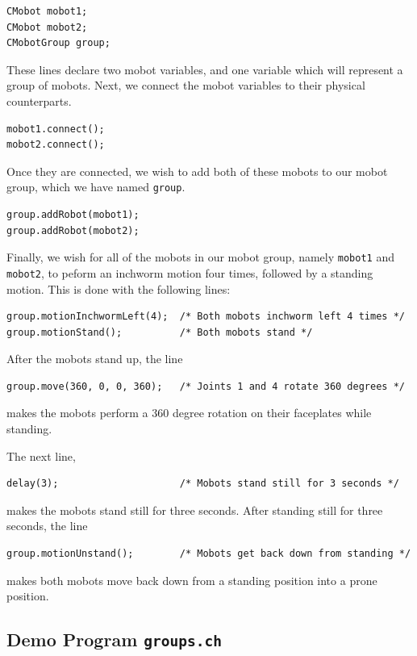 \documentclass{article}
\begin{document}
\begin{verbatim}
CMobot mobot1;
CMobot mobot2;
CMobotGroup group;
\end{verbatim}

These lines declare two mobot variables, and one variable which
will represent a group of mobots. Next, we connect the mobot
variables to their physical counterparts.

\begin{verbatim}
mobot1.connect();
mobot2.connect();
\end{verbatim}

Once they are connected, we wish to add both of these mobots to our mobot group,
which we have named \texttt{group}.

\begin{verbatim}
group.addRobot(mobot1);
group.addRobot(mobot2);
\end{verbatim}

Finally, we wish for all of the mobots in our mobot group, namely
\texttt{mobot1} and \texttt{mobot2}, to peform an inchworm motion four times, followed
by a standing motion. This is done with the following lines:

\begin{verbatim}
group.motionInchwormLeft(4);  /* Both mobots inchworm left 4 times */
group.motionStand();          /* Both mobots stand */
\end{verbatim}

After the mobots stand up, the line
\begin{verbatim}
group.move(360, 0, 0, 360);   /* Joints 1 and 4 rotate 360 degrees */
\end{verbatim}
makes the mobots perform a 360 degree rotation on their faceplates
while standing.

The next line, 
\begin{verbatim}
delay(3);                     /* Mobots stand still for 3 seconds */
\end{verbatim}
makes the mobots stand still for three seconds. After standing
still for three seconds, the line
\begin{verbatim}
group.motionUnstand();        /* Mobots get back down from standing */
\end{verbatim}
makes both mobots move back down from a standing position into a prone
position.

\subsection{Demo Program \texttt{groups.ch}}
\end{document}

